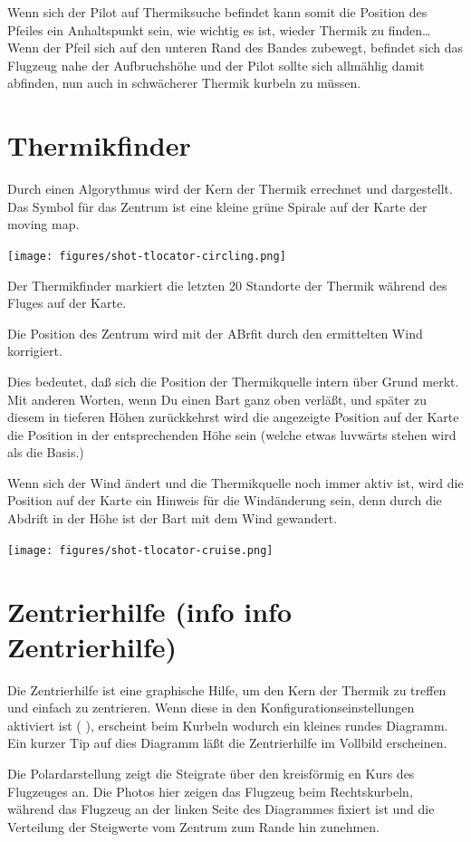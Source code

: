 Wenn sich der Pilot auf Thermiksuche befindet kann somit die Position des Pfeiles ein Anhaltspunkt sein,
wie wichtig es ist, wieder Thermik zu finden\dots
Wenn der Pfeil sich auf den unteren Rand des Bandes zubewegt, befindet sich das Flugzeug nahe der
Aufbruchshöhe und der Pilot sollte sich allmählig damit abfinden, nun auch in schwächerer Thermik kurbeln zu müssen.
\section{Thermikfinder}
Durch einen Algorythmus wird der Kern der Thermik errechnet und dargestellt.
Das Symbol für das Zentrum ist eine kleine grüne Spirale auf der Karte der moving map.
\begin{center}
\texttt{[image: figures/shot-tlocator-circling.png]}
\end{center}
Der Thermikfinder markiert die letzten 20 Standorte der Thermik während des Fluges auf der Karte.

Die Position des Zentrum wird mit der ABrfit durch den ermittelten Wind korrigiert.

Dies bedeutet, daß \xc sich die Position der Thermikquelle intern über Grund merkt.
Mit anderen Worten, wenn Du einen Bart ganz oben verläßt, und später zu diesem in tieferen
Höhen zurückkehrst wird die angezeigte Position auf der Karte die Position in der
entsprechenden Höhe sein (welche etwas luvwärts stehen wird als die Basis.)

Wenn sich der Wind ändert und die Thermikquelle noch immer aktiv ist,
wird die Position auf der Karte ein Hinweis für die Windänderung sein, denn
durch die Abdrift in der Höhe ist der Bart mit dem Wind gewandert.
\begin{center}
\texttt{[image: figures/shot-tlocator-cruise.png]}
\end{center}
\section{Zentrierhilfe (info info Zentrierhilfe)}
Die Zentrierhilfe ist eine graphische Hilfe, um den Kern der Thermik zu treffen und einfach zu zentrieren.
Wenn diese in den Konfigurationseinstellungen aktiviert ist ( ), erscheint beim
Kurbeln wodurch ein kleines  rundes Diagramm. Ein kurzer Tip auf dies Diagramm läßt die Zentrierhilfe im Vollbild erscheinen.

Die Polardarstellung zeigt die Steigrate über den kreisförmig en Kurs des Flugzeuges an.
Die Photos hier zeigen das Flugzeug beim Rechtskurbeln, während das Flugzeug an der linken
Seite des Diagrammes fixiert ist und die Verteilung der Steigwerte vom Zentrum zum Rande hin zunehmen.


